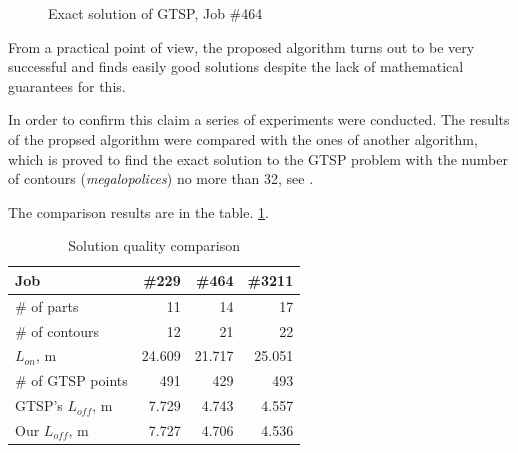 \documentclass{ifacconf}
\begin{document}
\begin{figure}
  \caption{Exact solution of GTSP, Job \#464}
  \label{gtsp-path}
\end{figure}

From a practical point of view, the proposed algorithm
turns out to be very successful
and finds easily good solutions
despite the lack of mathematical guarantees for this.

In order to confirm this claim
a series of experiments were conducted.
The results of the propsed algorithm
were compared with the ones
of another algorithm,
which is proved to
find the exact solution to the GTSP problem
with the number of contours
(\textit{megalopolices}) no more than 32,
see \cite{petunin2014local}.

The comparison results are in the table. \ref {exact-3}.

\begin{table}[h]
  \begin{center}
  \begin{tabular}{l|*{3}{r}}
      Job & \#229 & \#464 & \#3211 \\
      \hline
      \# of parts & 11 & 14 & 17\\
      \# of contours & 12 & 21 & 22 \\
      $L_{on}$, m & 24.609 & 21.717 & 25.051 \\
      \# of GTSP points & 491 & 429 & 493 \\
      GTSP's $L_{off}$, m & 7.729 & 4.743 & 4.557 \\
      Our $L_{off}$, m & 7.727 & 4.706 & 4.536 \\
  \end{tabular}
  \caption{Solution quality comparison}
  \label{exact-3}
  \end{center}
\end{table}
\end{document}
